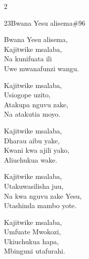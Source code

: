 \documentclass{article}
\begin{document}
\begin{multicols}{2}
\begin{hymn}{23}{Bwana Yesu alisema}{\#96}
\begin{stanza}
Bwana Yesu alisema,\\
Kajitwike msalaba,\\
Na kunifuata ili\\
Uwe mwanafunzi wangu.
\end{stanza}
\begin{stanza}
Kajitwike msalaba,\\
Usiogope uzito,\\
Atakupa nguvu zake,\\
Na atakutia moyo.
\end{stanza}
\begin{stanza}
Kajitwike msalaba,\\
Dharau aibu yake,\\
Kwani kwa ajili yako,\\
Aliuchukua wake.
\end{stanza}
\begin{stanza}
Kajitwike msalaba,\\
Utakuwasilisha juu,\\
Na kwa nguvu zake Yesu,\\
Utashinda mambo yote.
\end{stanza}
\begin{stanza}
Kajitwike msalaba,\\
Umfuate Mwokozi,\\
Ukiuchukua hapa,\\
Mbinguni utafurahi.
\end{stanza}
\end{hymn}


\end{multicols}
\end{document}
